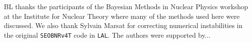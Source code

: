 \documentclass[prd,aps,letter,twocolumn,floatfix,notitlepage,nofootinbib]{revtex4-1}
\begin{document}
\begin{acknowledgments}

BL thanks the participants of the Bayesian Methods in Nuclear Physics workshop at the Institute for Nuclear Theory where many of the methods used here were discussed. We also thank Sylvain Marsat for correcting numerical instabilities in the original \texttt{SEOBNRv4T} code in \texttt{LAL}. The authors were supported by... 

\end{acknowledgments}


  
\end{document}
